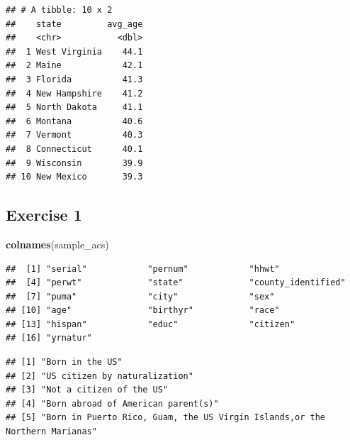 \documentclass[]{book}
\newenvironment{Shaded}{\begin{snugshade}}{\end{snugshade}}
\newcommand{\KeywordTok}[1]{\textcolor[rgb]{0.13,0.29,0.53}{\textbf{#1}}}
\newcommand{\NormalTok}[1]{#1}
\newcommand{\OperatorTok}[1]{\textcolor[rgb]{0.81,0.36,0.00}{\textbf{#1}}}
\newcommand{\StringTok}[1]{\textcolor[rgb]{0.31,0.60,0.02}{#1}}
\theoremstyle{definition}
\theoremstyle{definition}
\theoremstyle{definition}
\theoremstyle{remark}
\begin{document}
\begin{Shaded}
\begin{Highlighting}[]
\begin{Shaded}
\begin{Highlighting}[]
\begin{Shaded}
\begin{Highlighting}[]
\begin{verbatim}
## # A tibble: 10 x 2
##    state         avg_age
##    <chr>           <dbl>
##  1 West Virginia    44.1
##  2 Maine            42.1
##  3 Florida          41.3
##  4 New Hampshire    41.2
##  5 North Dakota     41.1
##  6 Montana          40.6
##  7 Vermont          40.3
##  8 Connecticut      40.1
##  9 Wisconsin        39.9
## 10 New Mexico       39.3
\end{verbatim}

\hypertarget{exercise-1}{%
\subsection*{Exercise 1}\label{exercise-1}}

\begin{Shaded}
\begin{Highlighting}[]
\KeywordTok{colnames}\NormalTok{(sample_acs)}
\end{Highlighting}
\end{Shaded}

\begin{verbatim}
##  [1] "serial"            "pernum"            "hhwt"             
##  [4] "perwt"             "state"             "county_identified"
##  [7] "puma"              "city"              "sex"              
## [10] "age"               "birthyr"           "race"             
## [13] "hispan"            "educ"              "citizen"          
## [16] "yrnatur"
\end{verbatim}

\begin{Shaded}
\end{Shaded}

\begin{verbatim}
## [1] "Born in the US"                                                           
## [2] "US citizen by naturalization"                                             
## [3] "Not a citizen of the US"                                                  
## [4] "Born abroad of American parent(s)"                                        
## [5] "Born in Puerto Rico, Guam, the US Virgin Islands,or the Northern Marianas"
\end{verbatim}

\begin{Shaded}
\end{Shaded}


\end{Highlighting}
\end{Shaded}
\end{Highlighting}
\end{Shaded}
\end{Highlighting}
\end{Shaded}
\end{document}
